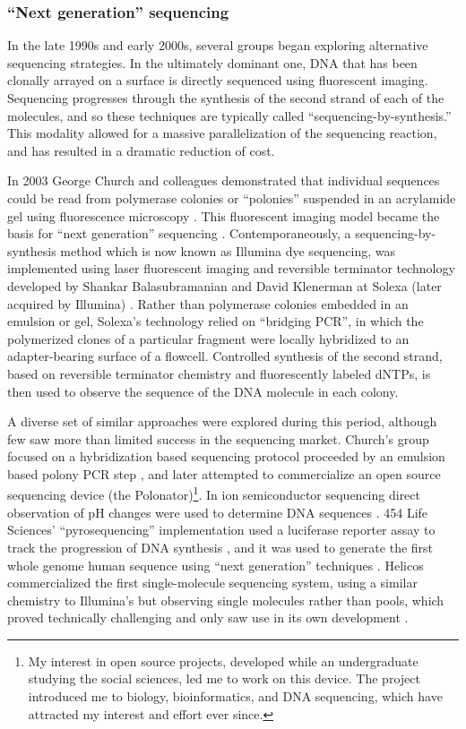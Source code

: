 \subsubsection{``Next generation'' sequencing}

In the late 1990s and early 2000s, several groups began exploring alternative sequencing strategies.
In the ultimately dominant one, DNA that has been clonally arrayed on a surface is directly sequenced using fluorescent imaging.
Sequencing progresses through the synthesis of the second strand of each of the molecules, and so these techniques are typically called ``sequencing-by-synthesis.''
This modality allowed for a massive parallelization of the sequencing reaction, and has resulted in a dramatic reduction of cost.

In 2003 George Church and colleagues demonstrated that individual sequences could be read from polymerase colonies or ``polonies'' suspended in an acrylamide gel using fluorescence microscopy \cite{mitra2003fluorescent}.
This fluorescent imaging model became the basis for ``next generation'' sequencing \cite{shendure2008next}.
Contemporaneously, a sequencing-by-synthesis method which is now known as Illumina dye sequencing, was implemented using laser fluorescent imaging and reversible terminator technology developed by Shankar Balasubramanian and David Klenerman at Solexa (later acquired by Illumina) \cite{balasubramanian2004arrayed, bentley2008accurate}.
Rather than polymerase colonies embedded in an emulsion or gel, Solexa's technology relied on ``bridging PCR'', in which the polymerized clones of a particular fragment were locally hybridized to an adapter-bearing surface of a flowcell.
Controlled synthesis of the second strand, based on reversible terminator chemistry \cite{canard1994dna} and fluorescently labeled dNTPs, is then used to observe the sequence of the DNA molecule in each colony.

A diverse set of similar approaches were explored during this period, although few saw more than limited success in the sequencing market.
Church's group focused on a hybridization based sequencing protocol proceeded by an emulsion based polony PCR step \cite{shendure2005accurate}, and later attempted to commercialize an open source sequencing device (the Polonator)\footnote{My interest in open source projects, developed while an undergraduate studying the social sciences, led me to work on this device. The project introduced me to biology, bioinformatics, and DNA sequencing, which have attracted my interest and effort ever since.}.
In ion semiconductor sequencing direct observation of pH changes were used to determine DNA sequences \cite{rusk2010torrents}.
454 Life Sciences' ``pyrosequencing'' implementation used a luciferase reporter assay to track the progression of DNA synthesis \cite{margulies2005genome}, and it was used to generate the first whole genome human sequence using ``next generation'' techniques \cite{wheeler2008complete}.
Helicos commercialized the first single-molecule sequencing system, using a similar chemistry to Illumina's but observing single molecules rather than pools, which proved technically challenging and only saw use in its own development \cite{harris2008single}.

